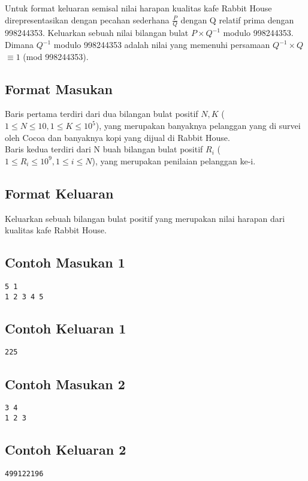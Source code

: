 \documentclass{article}
\begin{document}
Untuk format keluaran semisal nilai harapan kualitas kafe Rabbit House direpresentasikan dengan pecahan sederhana $\frac{P}{Q}$ dengan Q relatif prima dengan 998244353. Keluarkan sebuah nilai bilangan bulat $P \times Q^{-1}$ modulo 998244353. Dimana $Q^{-1}$ modulo 998244353 adalah nilai yang memenuhi persamaan $Q^{-1} \times Q$ $\equiv 1$ (mod 998244353). 

\subsection*{Format Masukan}

Baris pertama terdiri dari dua bilangan bulat positif $N, K$ ($1 \leq N \leq 10, 1 \leq K \leq 10^{5}$), yang merupakan banyaknya pelanggan yang di survei oleh Cocoa dan banyaknya kopi yang dijual di Rabbit House.\\
Baris kedua terdiri dari N buah bilangan bulat positif $R_i$ ($1 \leq R_i \leq 10^9, 1 \leq i \leq N $), yang merupakan penilaian pelanggan ke-i.

\subsection*{Format Keluaran}

Keluarkan sebuah bilangan bulat positif yang merupakan nilai harapan dari kualitas kafe Rabbit House.

\begin{multicols}{2}
\subsection*{Contoh Masukan 1}
\begin{lstlisting}
5 1
1 2 3 4 5
\end{lstlisting}
\columnbreak
\subsection*{Contoh Keluaran 1}
\begin{lstlisting}
225
\end{lstlisting}
\vfill
\null
\end{multicols}

\begin{multicols}{2}
\subsection*{Contoh Masukan 2}
\begin{lstlisting}
3 4
1 2 3
\end{lstlisting}
\columnbreak
\subsection*{Contoh Keluaran 2}
\begin{lstlisting}
499122196
\end{lstlisting}
\vfill
\null
\end{multicols}
\end{document}
